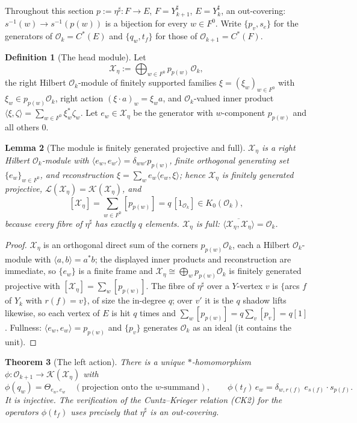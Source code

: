 \documentclass[11pt]{amsart}
\numberwithin{equation}{section}
\newtheorem{theorem}{Theorem}[section]
\newtheorem{lemma}[theorem]{Lemma}
\theoremstyle{definition}
\newtheorem{definition}[theorem]{Definition}
\theoremstyle{remark}
\newcommand{\cO}{\mathcal{O}}
\newcommand{\cX}{\mathcal{X}}
\newcommand{\cK}{\mathcal{K}}
\newcommand{\cL}{\mathcal{L}}
\newcommand{\Ysh}[1]{Y_{#1}^{\sharp}}
\begin{document}
Throughout this section $p:=\eta^{\sharp}\colon F\to E$, $F=\Ysh{k+1}$, $E=\Ysh{k}$, an
out-covering: $s^{-1}(w)\to s^{-1}(p(w))$ is a bijection for every $w\in F^0$. Write
$\{p_v,s_e\}$ for the generators of $\cO_k=C^*(E)$ and $\{q_w,t_f\}$ for those of
$\cO_{k+1}=C^*(F)$.

\begin{definition}[The head module]\label{def:module}
Let
\[
\cX_\eta:=\bigoplus_{w\in F^0}p_{p(w)}\,\cO_k ,
\]
the right Hilbert $\cO_k$-module of finitely supported families $\xi=(\xi_w)_{w\in F^0}$
with $\xi_w\in p_{p(w)}\cO_k$, right action $(\xi\cdot a)_w=\xi_wa$, and $\cO_k$-valued inner
product $\langle\xi,\zeta\rangle=\sum_{w\in F^0}\xi_w^{*}\zeta_w$. Let $e_w\in\cX_\eta$ be
the generator with $w$-component $p_{p(w)}$ and all others $0$.
\end{definition}

\begin{lemma}[The module is finitely generated projective and full]\label{lem:fgp}
$\cX_\eta$ is a right Hilbert $\cO_k$-module with $\langle e_w,e_{w'}\rangle=\delta_{ww'}p_{p(w)}$,
finite orthogonal generating set $\{e_w\}_{w\in F^0}$, and reconstruction
$\xi=\sum_we_w\langle e_w,\xi\rangle$; hence $\cX_\eta$ is finitely generated projective,
$\cL(\cX_\eta)=\cK(\cX_\eta)$, and
\[
[\cX_\eta]=\sum_{w\in F^0}[p_{p(w)}]=q\,[1_{\cO_k}]\in K_0(\cO_k),
\]
because every fibre of $\eta^{\sharp}$ has exactly $q$ elements. $\cX_\eta$ is full:
$\overline{\langle\cX_\eta,\cX_\eta\rangle}=\cO_k$.
\end{lemma}

\begin{proof}
$\cX_\eta$ is an orthogonal direct sum of the corners $p_{p(w)}\cO_k$, each a Hilbert
$\cO_k$-module with $\langle a,b\rangle=a^*b$; the displayed inner products and
reconstruction are immediate, so $\{e_w\}$ is a finite frame and $\cX_\eta\cong\bigoplus_w
p_{p(w)}\cO_k$ is finitely generated projective with $[\cX_\eta]=\sum_w[p_{p(w)}]$. The
fibre of $\eta^{\sharp}$ over a $Y$-vertex $v$ is $\{$arcs $f$ of $Y_k$ with $r(f)=v\}$, of
size the in-degree $q$; over $v'$ it is the $q$ shadow lifts likewise, so each vertex of
$E$ is hit $q$ times and $\sum_w[p_{p(w)}]=q\sum_v[p_v]=q[1]$. Fullness: $\langle
e_w,e_w\rangle=p_{p(w)}$ and $\{p_v\}$ generates $\cO_k$ as an ideal (it contains the unit).
\end{proof}

\begin{theorem}[The left action]\label{thm:leftaction}
There is a unique $*$-homomorphism $\phi\colon\cO_{k+1}\to\cK(\cX_\eta)$ with
\[
\phi(q_w)=\Theta_{e_w,e_w}\quad(\text{projection onto the }w\text{-summand}),\qquad
\phi(t_f)\,e_{w}=\delta_{w,r(f)}\;e_{s(f)}\cdot s_{p(f)} .
\]
It is injective. The verification of the Cuntz--Krieger relation \emph{(CK2)} for the
operators $\phi(t_f)$ uses precisely that $\eta^{\sharp}$ is an out-covering.
\end{theorem}
\end{document}

